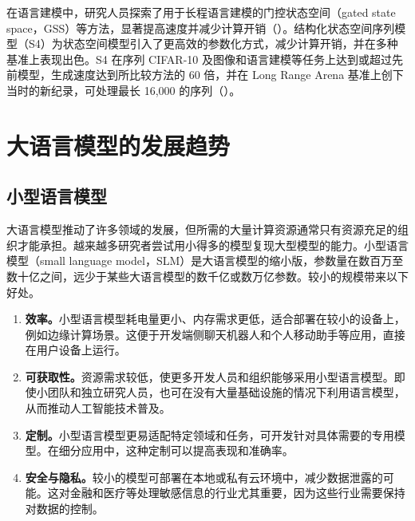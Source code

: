 在语言建模中，研究人员探索了用于长程语言建模的门控状态空间（gated state space，GSS）等方法，显著提高速度并减少计算开销（）。结构化状态空间序列模型（S4）为状态空间模型引入了更高效的参数化方式，减少计算开销，并在多种基准上表现出色。S4 在序列 CIFAR-10 及图像和语言建模等任务上达到或超过先前模型，生成速度达到所比较方法的 60 倍，并在 Long Range Arena 基准上创下当时的新纪录，可处理最长 16,000 的序列（）。

\section{大语言模型的发展趋势}
\label{sec:ch10-trends}

\subsection{小型语言模型}
大语言模型推动了许多领域的发展，但所需的大量计算资源通常只有资源充足的组织才能承担。越来越多研究者尝试用小得多的模型复现大型模型的能力。小型语言模型（small language model，SLM）是大语言模型的缩小版，参数量在数百万至数十亿之间，远少于某些大语言模型的数千亿或数万亿参数。较小的规模带来以下好处。

\begin{enumerate}
\item \textbf{效率。}小型语言模型耗电量更小、内存需求更低，适合部署在较小的设备上，例如边缘计算场景。这便于开发端侧聊天机器人和个人移动助手等应用，直接在用户设备上运行。
\item \textbf{可获取性。}资源需求较低，使更多开发人员和组织能够采用小型语言模型。即使小团队和独立研究人员，也可在没有大量基础设施的情况下利用语言模型，从而推动人工智能技术普及。
\item \textbf{定制。}小型语言模型更易适配特定领域和任务，可开发针对具体需要的专用模型。在细分应用中，这种定制可以提高表现和准确率。
\item \textbf{安全与隐私。}较小的模型可部署在本地或私有云环境中，减少数据泄露的可能。这对金融和医疗等处理敏感信息的行业尤其重要，因为这些行业需要保持对数据的控制。
\end{enumerate}

